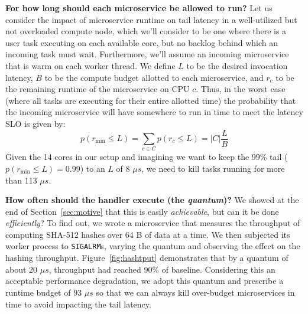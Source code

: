 \textbf{For how long should each microservice be allowed to run?}
Let us consider the impact of microservice runtime on tail latency in a well-utilized
but not overloaded compute node, which we'll consider to be one where there is a user
task executing on each available core, but no backlog behind which an incoming task
must wait.
Furthermore, we'll assume an incoming microservice that is warm on each
worker thread.  We define $L$ to be the desired invocation latency, $B$ to be the
compute budget allotted to each microservice, and $r_c$ to be the remaining runtime
of the microservice on CPU $c$.  Thus, in the worst case (where all tasks are
executing for their entire allotted time) the probability that the incoming
microservice will have somewhere to run in time to meet the latency SLO is given by:
\begin{equation}
p(r_\textrm{min} \le L) = \sum\limits_{c \in C} p(r_c \le L) = \big| C \big| \frac{L}{B}
\end{equation}
Given the 14 cores in our setup and imagining we want to keep the 99\% tail
($p(r_\textrm{min} \le L) = 0.99$) to an $L$ of 8 $\mu{}s$, we need to kill tasks
running for more than 113 $\mu{}s$.


\textbf{How often should the handler execute (the \emph{quantum})?}
We showed at the end of Section~\ref{sec:motive} that this is easily
\textit{achievable}, but can it be done \textit{efficiently}?  To find out, we wrote
a microservice that measures the throughput of computing SHA-512 hashes over 64 B of
data at a time.  We then subjected its worker process to \texttt{SIGALRM}s, varying
the quantum and observing the effect on the hashing throughput.
Figure~\ref{fig:hashtput} demonstrates that by a quantum of about 20 $\mu{}s$,
throughput had reached 90\% of baseline.  Considering this an acceptable performance
degradation, we adopt this quantum and prescribe a runtime budget of 93 $\mu{}s$ so
that we can always kill over-budget microservices in time to avoid impacting the tail
latency.

